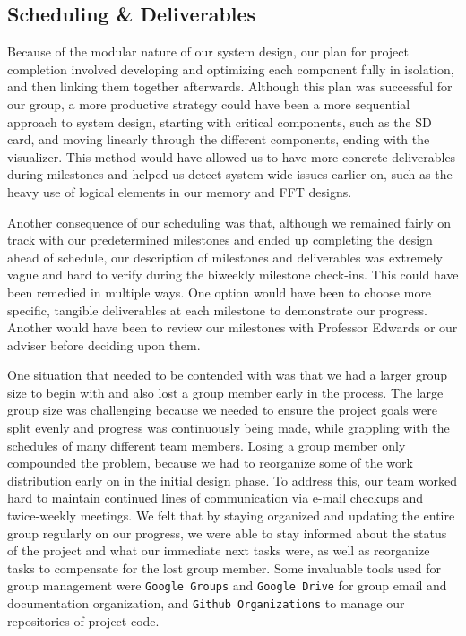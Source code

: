 \documentclass{article}
\begin{document}
\subsection{Scheduling \& Deliverables}
Because of the modular nature of our system design, our plan for project completion 
involved developing and optimizing each component fully in isolation, and then 
linking them together afterwards. Although this plan was successful for our group, a 
more productive strategy could have been a more sequential approach to system 
design, starting with critical components, such as the SD card, and moving linearly 
through the different components, ending with the visualizer.  This method would 
have allowed us to have more concrete deliverables during milestones and helped 
us detect system-wide issues earlier on, such as the heavy use of logical elements in 
our memory and FFT designs. 

Another consequence of our scheduling was that, although we remained fairly on 
track with our predetermined milestones and ended up completing the design ahead 
of schedule, our description of milestones and deliverables was extremely vague and 
hard to verify during the biweekly milestone check-ins. This could have been 
remedied in multiple ways. One option would have been to choose more specific, 
tangible deliverables at each milestone to demonstrate our progress. Another would 
have been to review our milestones with Professor Edwards or our adviser before 
deciding upon them. 

One situation that needed to be contended with was that we had a larger group size 
to begin with and also lost a group member early in the process. The large group size 
was challenging because we needed to ensure the project goals were split evenly 
and progress was continuously being made, while grappling with the schedules of 
many different team members. Losing a group member only compounded the 
problem, because we had to reorganize some of the work distribution early on in the 
initial design phase. To address this, our team worked hard to maintain continued 
lines of communication via e-mail checkups and twice-weekly meetings. We felt that 
by staying organized and updating the entire group regularly on our progress, we 
were able to stay informed about the status of the project and what our immediate 
next tasks were, as well as reorganize tasks to compensate for the lost group 
member. Some invaluable tools used for group management were \texttt{Google 
Groups} and \texttt{Google Drive} for group email and documentation organization, 
and \texttt{Github Organizations} to manage our repositories of project code.
\end{document}
